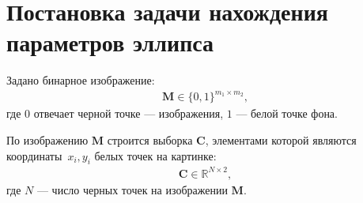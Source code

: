 \documentclass[12pt, twoside]{article}
\numberwithin{equation}{section}
\begin{document}
 \appendix

\section{Постановка задачи нахождения параметров эллипса}\label{apendix:el}
Задано бинарное изображение:
\begin{equation}
\label{apendix:el:eq:1}
\begin{aligned}
\textbf{M} \in \{0,1\}^{m_1 \times m_2},
\end{aligned}
\end{equation}
где $0$ отвечает черной точке --- изображения, $1$ --- белой точке фона.

По изображению $\textbf{M}$ строится выборка $\textbf{C}$, элементами которой являются координаты~$x_i, y_i$ белых точек на картинке:
\begin{equation}
\label{apendix:el:eq:2}
\begin{aligned}
\textbf{C} \in  \mathbb{R}^{N \times 2},
\end{aligned}
\end{equation}
где $N$ --- число черных точек на изображении $\textbf{M}$.
\end{document}
